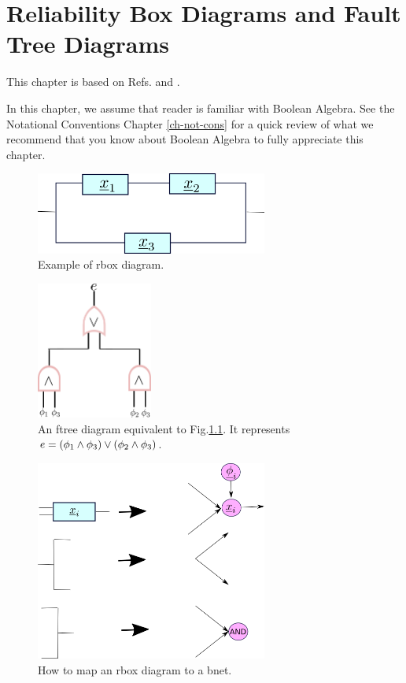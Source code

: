 \chapter{Reliability Box Diagrams and Fault 
Tree Diagrams}
This chapter is based on
Refs.\cite{reliasoft}
and \cite{ftree-manual}.

In this chapter, we assume that
reader is familiar
with
Boolean Algebra. See 
the Notational 
Conventions Chapter \ref{ch-not-cons}
for a quick review 
of what
we recommend that you know about
Boolean Algebra
to fully appreciate this chapter.

\begin{figure}[h!]
\centering
\includegraphics[width=3in]
{reliability/relia-example.png}
\caption{Example of rbox diagram.} 
\label{fig-relia-rbox}
\end{figure}

\begin{figure}[h!]
\centering
\includegraphics[width=1.5in]
{reliability/relia-ftree.png}
\caption{An ftree diagram equivalent to
Fig.\ref{fig-relia-rbox}. It
represents 
$e=(\phi_1\wedge \phi_3)\vee(\phi_2\wedge\phi_3)$. } 
\label{fig-relia-ftree}
\end{figure}

\begin{figure}[h!]
\centering
\includegraphics[width=3in]
{reliability/relia-map.png}
\caption{How to map an rbox diagram to a bnet.} 
\label{fig-relia-map}
\end{figure}

